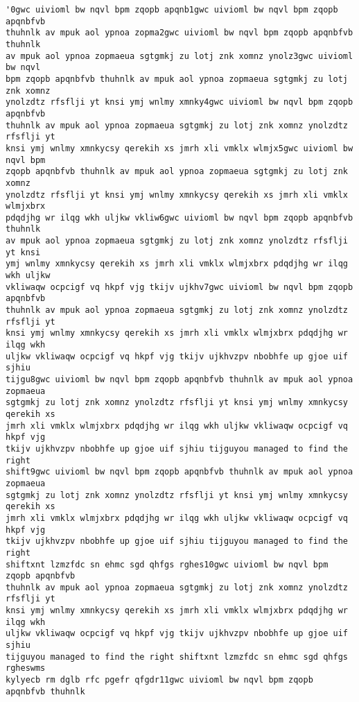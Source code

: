 \documentclass[11pt]{article}
\makeatletter
\newcommand{\boxspacing}{\kern\kvtcb@left@rule\kern\kvtcb@boxsep}
\newcommand{\prompt}[4]{
        \ttfamily\llap{{\color{#2}[#3]:\hspace{3pt}#4}}\vspace{-\baselineskip}
    }
\makeatother
\begin{document}
            \begin{tcolorbox}[breakable, size=fbox, boxrule=.5pt, pad at break*=1mm, opacityfill=0]
\prompt{Out}{outcolor}{74}{\boxspacing}
\begin{Verbatim}[commandchars=\\\{\}]
'0gwc uivioml bw nqvl bpm zqopb apqnb1gwc uivioml bw nqvl bpm zqopb apqnbfvb
thuhnlk av mpuk aol ypnoa zopma2gwc uivioml bw nqvl bpm zqopb apqnbfvb thuhnlk
av mpuk aol ypnoa zopmaeua sgtgmkj zu lotj znk xomnz ynolz3gwc uivioml bw nqvl
bpm zqopb apqnbfvb thuhnlk av mpuk aol ypnoa zopmaeua sgtgmkj zu lotj znk xomnz
ynolzdtz rfsflji yt knsi ymj wnlmy xmnky4gwc uivioml bw nqvl bpm zqopb apqnbfvb
thuhnlk av mpuk aol ypnoa zopmaeua sgtgmkj zu lotj znk xomnz ynolzdtz rfsflji yt
knsi ymj wnlmy xmnkycsy qerekih xs jmrh xli vmklx wlmjx5gwc uivioml bw nqvl bpm
zqopb apqnbfvb thuhnlk av mpuk aol ypnoa zopmaeua sgtgmkj zu lotj znk xomnz
ynolzdtz rfsflji yt knsi ymj wnlmy xmnkycsy qerekih xs jmrh xli vmklx wlmjxbrx
pdqdjhg wr ilqg wkh uljkw vkliw6gwc uivioml bw nqvl bpm zqopb apqnbfvb thuhnlk
av mpuk aol ypnoa zopmaeua sgtgmkj zu lotj znk xomnz ynolzdtz rfsflji yt knsi
ymj wnlmy xmnkycsy qerekih xs jmrh xli vmklx wlmjxbrx pdqdjhg wr ilqg wkh uljkw
vkliwaqw ocpcigf vq hkpf vjg tkijv ujkhv7gwc uivioml bw nqvl bpm zqopb apqnbfvb
thuhnlk av mpuk aol ypnoa zopmaeua sgtgmkj zu lotj znk xomnz ynolzdtz rfsflji yt
knsi ymj wnlmy xmnkycsy qerekih xs jmrh xli vmklx wlmjxbrx pdqdjhg wr ilqg wkh
uljkw vkliwaqw ocpcigf vq hkpf vjg tkijv ujkhvzpv nbobhfe up gjoe uif sjhiu
tijgu8gwc uivioml bw nqvl bpm zqopb apqnbfvb thuhnlk av mpuk aol ypnoa zopmaeua
sgtgmkj zu lotj znk xomnz ynolzdtz rfsflji yt knsi ymj wnlmy xmnkycsy qerekih xs
jmrh xli vmklx wlmjxbrx pdqdjhg wr ilqg wkh uljkw vkliwaqw ocpcigf vq hkpf vjg
tkijv ujkhvzpv nbobhfe up gjoe uif sjhiu tijguyou managed to find the right
shift9gwc uivioml bw nqvl bpm zqopb apqnbfvb thuhnlk av mpuk aol ypnoa zopmaeua
sgtgmkj zu lotj znk xomnz ynolzdtz rfsflji yt knsi ymj wnlmy xmnkycsy qerekih xs
jmrh xli vmklx wlmjxbrx pdqdjhg wr ilqg wkh uljkw vkliwaqw ocpcigf vq hkpf vjg
tkijv ujkhvzpv nbobhfe up gjoe uif sjhiu tijguyou managed to find the right
shiftxnt lzmzfdc sn ehmc sgd qhfgs rghes10gwc uivioml bw nqvl bpm zqopb apqnbfvb
thuhnlk av mpuk aol ypnoa zopmaeua sgtgmkj zu lotj znk xomnz ynolzdtz rfsflji yt
knsi ymj wnlmy xmnkycsy qerekih xs jmrh xli vmklx wlmjxbrx pdqdjhg wr ilqg wkh
uljkw vkliwaqw ocpcigf vq hkpf vjg tkijv ujkhvzpv nbobhfe up gjoe uif sjhiu
tijguyou managed to find the right shiftxnt lzmzfdc sn ehmc sgd qhfgs rgheswms
kylyecb rm dglb rfc pgefr qfgdr11gwc uivioml bw nqvl bpm zqopb apqnbfvb thuhnlk

\end{Verbatim}
\end{tcolorbox}
\end{document}
